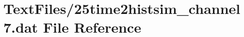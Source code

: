 \hypertarget{25time2histsim__channel7_8dat}{}\section{Text\+Files/25time2histsim\+\_\+channel7.dat File Reference}
\label{25time2histsim__channel7_8dat}
